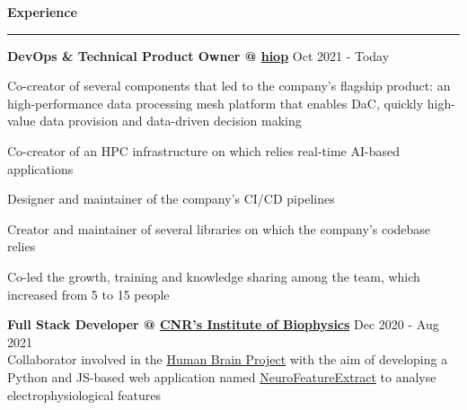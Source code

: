 \documentclass[11pt,letterpaper]{article}
\begin{document}
\begin{justify}
		{\large \textbf{Experience} \strut}
	\vspace{0.03cm}
	\hrule
	\begin{itemize}[label={}, leftmargin=0pt]
		\begin{item}
		      \textbf{DevOps \& Technical Product Owner @ \href{https://hiop.io/}{hiop}}
		      \hfill
		      Oct 2021 - Today
		      \vspace{-0.15cm}
		      \begin{itemize}[label={$\bullet$}, leftmargin=12.5pt, noitemsep]
			      \begin{item}
			            Co-creator of several components that led to the company's flagship product: an high-performance data processing mesh platform that enables DaC, quickly high-value data provision and data-driven decision making
			      \end{item}
			      \begin{item}
			            Co-creator of an HPC infrastructure on which relies real-time AI-based applications
			      \end{item}
			      \begin{item}
			            Designer and maintainer of the company's CI/CD pipelines
			      \end{item}
			      \begin{item}
			            Creator and maintainer of several libraries on which the company's codebase relies
			      \end{item}
			      \begin{item}
			            Co-led the growth, training and knowledge sharing among the team, which increased from 5 to 15 people
			      \end{item}
		      \end{itemize}
		\end{item}
		\begin{item}
		      \textbf{Full Stack Developer @ \href{https://www.ibf.cnr.it/index.php/ibf/palermo/?lang=en}{CNR’s Institute of Biophysics}}
		      \hfill
		      Dec 2020 - Aug 2021
		      \vspace{0.05cm}
		      \\
		      Collaborator involved in the \href{https://www.humanbrainproject.eu/en/}{Human Brain Project} with the aim of developing a Python and JS-based web application named \href{https://hbp-bsp-hhnb.cineca.it/efelg/}{NeuroFeatureExtract} to analyse electrophysiological features
		\end{item}
		\begin{item}

\end{item}
\end{itemize}
\end{justify}
\end{document}
